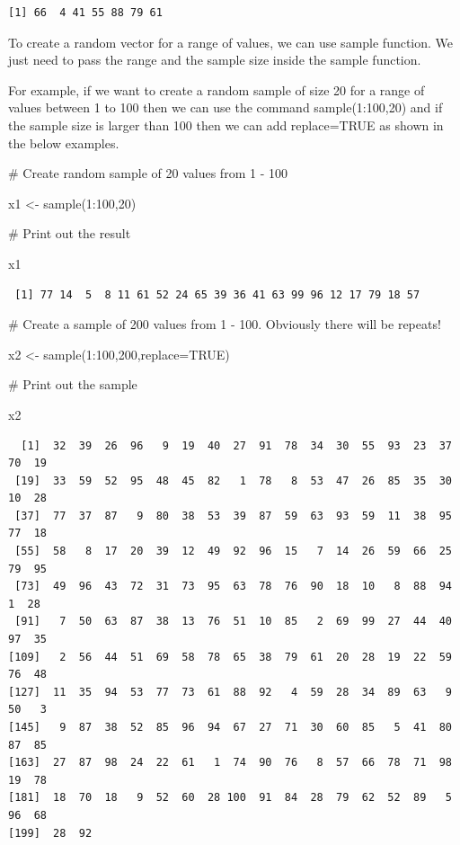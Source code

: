 \documentclass[
  letterpaper,
  DIV=11,
  numbers=noendperiod]{scrreprt}
\newenvironment{Shaded}{\begin{snugshade}}{\end{snugshade}}
\newcommand{\AttributeTok}[1]{\textcolor[rgb]{0.40,0.45,0.13}{#1}}
\newcommand{\CommentTok}[1]{\textcolor[rgb]{0.37,0.37,0.37}{#1}}
\newcommand{\ConstantTok}[1]{\textcolor[rgb]{0.56,0.35,0.01}{#1}}
\newcommand{\DecValTok}[1]{\textcolor[rgb]{0.68,0.00,0.00}{#1}}
\newcommand{\FunctionTok}[1]{\textcolor[rgb]{0.28,0.35,0.67}{#1}}
\newcommand{\NormalTok}[1]{\textcolor[rgb]{0.00,0.23,0.31}{#1}}
\newcommand{\OtherTok}[1]{\textcolor[rgb]{0.00,0.23,0.31}{#1}}
\newcommand{\SpecialCharTok}[1]{\textcolor[rgb]{0.37,0.37,0.37}{#1}}
\begin{document}
\begin{verbatim}
[1] 66  4 41 55 88 79 61
\end{verbatim}

To create a random vector for a range of values, we can use sample
function. We just need to pass the range and the sample size inside the
sample function.

For example, if we want to create a random sample of size 20 for a range
of values between 1 to 100 then we can use the command sample(1:100,20)
and if the sample size is larger than 100 then we can add replace=TRUE
as shown in the below examples.

\begin{Shaded}
\begin{Highlighting}[]
\CommentTok{\# Create random sample of 20 values from 1 {-} 100}

\NormalTok{x1 }\OtherTok{\textless{}{-}} \FunctionTok{sample}\NormalTok{(}\DecValTok{1}\SpecialCharTok{:}\DecValTok{100}\NormalTok{,}\DecValTok{20}\NormalTok{)}

\CommentTok{\# Print out the result}

\NormalTok{x1}
\end{Highlighting}
\end{Shaded}

\begin{verbatim}
 [1] 77 14  5  8 11 61 52 24 65 39 36 41 63 99 96 12 17 79 18 57
\end{verbatim}

\begin{Shaded}
\begin{Highlighting}[]
\CommentTok{\# Create a sample of 200 values from 1 {-} 100. Obviously there will be repeats!}

\NormalTok{x2 }\OtherTok{\textless{}{-}} \FunctionTok{sample}\NormalTok{(}\DecValTok{1}\SpecialCharTok{:}\DecValTok{100}\NormalTok{,}\DecValTok{200}\NormalTok{,}\AttributeTok{replace=}\ConstantTok{TRUE}\NormalTok{)}

\CommentTok{\# Print out the sample}

\NormalTok{x2}
\end{Highlighting}
\end{Shaded}

\begin{verbatim}
  [1]  32  39  26  96   9  19  40  27  91  78  34  30  55  93  23  37  70  19
 [19]  33  59  52  95  48  45  82   1  78   8  53  47  26  85  35  30  10  28
 [37]  77  37  87   9  80  38  53  39  87  59  63  93  59  11  38  95  77  18
 [55]  58   8  17  20  39  12  49  92  96  15   7  14  26  59  66  25  79  95
 [73]  49  96  43  72  31  73  95  63  78  76  90  18  10   8  88  94   1  28
 [91]   7  50  63  87  38  13  76  51  10  85   2  69  99  27  44  40  97  35
[109]   2  56  44  51  69  58  78  65  38  79  61  20  28  19  22  59  76  48
[127]  11  35  94  53  77  73  61  88  92   4  59  28  34  89  63   9  50   3
[145]   9  87  38  52  85  96  94  67  27  71  30  60  85   5  41  80  87  85
[163]  27  87  98  24  22  61   1  74  90  76   8  57  66  78  71  98  19  78
[181]  18  70  18   9  52  60  28 100  91  84  28  79  62  52  89   5  96  68
[199]  28  92
\end{verbatim}
\end{document}

